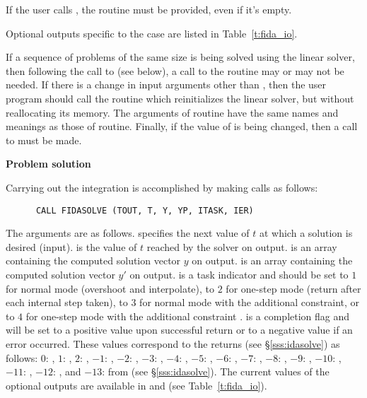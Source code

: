 \begin{Steps}
  {\warn} If the user calls , the routine  must
  be provided, even if it's empty.

  Optional outputs specific to the {\sptfqmr} case are listed in Table~\ref{t:fida_io}.
  
  If a sequence of problems of the same size is being solved using the {\sptfqmr}
  linear solver, then following the call to  (see below), a call to
  the  routine may or may not be needed.  If there is a change in input
  arguments other than , then the user program should call the routine
   which reinitializes the {\sptfqmr} linear solver, but without
  reallocating its memory. The arguments of  routine have the same
  names and meanings as those of  routine.  Finally, if the value of
   is being changed, then a call to  must be made.

\item {\bf Problem solution}

  Carrying out the integration is accomplished by making calls as follows:
\begin{verbatim}
      CALL FIDASOLVE (TOUT, T, Y, YP, ITASK, IER)
\end{verbatim}
  The arguments are as follows.
   specifies the next value of $t$ at which a solution is desired (input).
   is the value of $t$ reached by the solver on output.
   is an array containing the computed solution vector $y$ on output.
   is an array containing the computed solution vector $y'$ on output.
   is a task indicator and should be set to $1$ for normal mode 
  (overshoot  and interpolate), to $2$ for one-step mode 
  (return after each internal step taken), to $3$ for normal mode with
  the additional  constraint, or to $4$ for one-step mode 
  with the additional constraint .
   is a completion flag and will be set to a positive value upon
  successful return or to a negative value if an error occurred. These values
  correspond to the  returns (see \S\ref{sss:idasolve}) as follows:
  $0$: , $1$: , $2$: ,
  $-1$: , $-2$: , $-3$: ,
  $-4$: , $-5$: ,
  $-6$: , $-7$: ,
  $-8$: , $-9$: ,
  $-10$: , $-11$: ,
  $-12$: , and
  $-13$:  from  (see \S\ref{sss:idasolve}).
  The current values of the optional outputs are available in  and
   (see Table~\ref{t:fida_io}).
  

\end{Steps}

